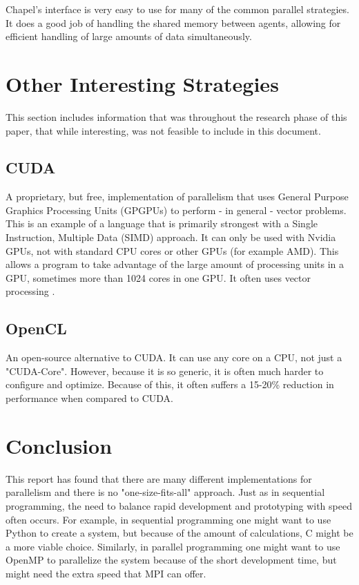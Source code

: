 \documentclass[12pt]{article}
\begin{document}


Chapel's interface is very easy to use for many of the common parallel strategies. It does a good job of handling the shared memory between agents, allowing for efficient handling of large amounts of data simultaneously.

\section{Other Interesting Strategies}

This section includes information that was throughout the research phase of this paper, that while interesting, was not feasible to include in this document.

\subsection{CUDA}

A proprietary, but free, implementation of parallelism that uses General Purpose Graphics Processing Units (GPGPUs) to perform - in general - vector problems. This is an example of a language that is primarily strongest with a Single Instruction, Multiple Data (SIMD) approach. It can only be used with Nvidia GPUs, not with standard CPU cores or other GPUs (for example AMD). This allows a program to take advantage of the large amount of processing units in a GPU, sometimes more than 1024 cores in one GPU. It often uses vector processing \cite{cuda}.

\subsection{OpenCL}

An open-source alternative to CUDA. It can use any core on a CPU, not just a "CUDA-Core". However, because it is so generic, it is often much harder to configure and optimize. Because of this, it often suffers a 15-20\% reduction in performance when compared to CUDA.

\section{Conclusion}

This report has found that there are many different implementations for parallelism and there is no "one-size-fits-all" approach. Just as in sequential programming, the need to balance rapid development and prototyping with speed often occurs. For example, in sequential programming one might want to use Python to create a system, but because of the amount of calculations, C might be a more viable choice. Similarly, in parallel programming one might want to use OpenMP to parallelize the system because of the short development time, but might need the extra speed that MPI can offer.
\end{document}
